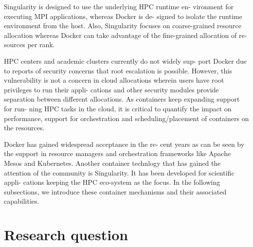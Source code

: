 \documentclass[conference]{IEEEtran}
\begin{document}
Singularity is designed to use the underlying HPC runtime en-
vironment for executing MPI applications, whereas Docker is de-
signed to isolate the runtime environment from the host. Also,
Singularity focuses on coarse-grained resource allocation whereas
Docker can take advantage of the fine-grained allocation of re-
sources per rank.

HPC centers and academic clusters currently do not widely sup-
port Docker due to reports of security concerns that root escalation
is possible. However, this vulnerability is not a concern in cloud
allocations wherein users have root privileges to run their appli-
cations and other security modules provide separation between
different allocations. As containers keep expanding support for run-
ning HPC tasks in the cloud, it is critical to quantify the impact on
performance, support for orchestration and scheduling/placement
of containers on the resources.

Docker has gained widespread acceptance in the re-
cent years as can be seen by the support in resource managers
and orchestration frameworks like Apache Mesos and Kubernetes.
Another container technlogy that has gained the attention of the
community is Singularity. It has been developed for scientific appli-
cations keeping the HPC eco-system as the focus. In the following
subsections, we introduce these container mechanisms and their
associated capabilities.



\section{Research question}


\end{document}
